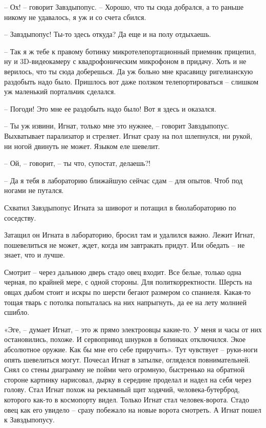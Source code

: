 \documentclass[ebook,oneside,final,openright]{memoir}
\begin{document}
– Ох! – говорит Завздыпопус. – Хорошо, что ты сюда добрался, а то раньше никому не удавалось, я уж и со счета сбился.\par
– Завздыпопус! Ты-то здесь откуда? Да еще и на полу отдыхаешь.\par
– Так я ж тебе к правому ботинку микротелепортационный приемник прицепил, ну и 3D-видеокамеру с квадрофоническим микрофоном в придачу. Хоть и не верилось, что ты сюда доберешься. Да уж больно мне красавицу ригелианскую раздобыть надо было. Пришлось вот даже ползком телепортироваться – слишком уж маленький портальчик сделался.\par
– Погоди! Это мне ее раздобыть надо было! Вот я здесь и оказался.\par
– Ты уж извини, Игнат, только мне это нужнее, – говорит Завздыпопус. Выхватывает парализатор и стреляет. Игнат сразу на пол шлепнулся, ни рукой, ни ногой двинуть не может. Языком еле шевелит.\par
– Ой, – говорит, – ты что, супостат, делаешь?!\par
– Да я тебя в лабораторию ближайшую сейчас сдам – для опытов. Чтоб под ногами не путался.\par
Схватил Завздыпопус Игната за шиворот и потащил в биолабораторию по соседству.\par
\par
Затащил он Игната в лабораторию, бросил там и удалился важно. Лежит Игнат, пошевелиться не может, ждет, когда им завтракать придут. Или обедать – не знает, что и лучше. \par
Смотрит – через дальнюю дверь стадо овец входит. Все белые, только одна черная, по крайней мере, с одной стороны. Для политкорректности. Шерсть на овцах дыбом стоит и искры по шерсти бегают размером со спаниеля. Какая-то тощая тварь с потолка попыталась на них напрыгнуть, да ее на лету молнией сшибло.\par
\par
«Эге, – думает Игнат, – это ж прямо электроовцы какие-то. У меня и часы от них остановились, похоже. И сервопривод шнурков в ботинках отключился. Экое абсолютное оружие. Как бы мне его себе приручить». Тут чувствует – руки-ноги опять шевелиться могут. Почесал Игнат в затылке, огляделся повнимательней. Снял со стены диаграмму не пойми чего огромную, быстренько на обратной стороне картинку нарисовал, дырку в середине проделал и надел на себя через голову. Стал Игнат похож на рекламный щит ходячий, человека-бутерброд, которого как-то в космопорту видел. Только Игнат стал человек-ворота. Стадо овец как его увидело – сразу побежало на новые ворота смотреть. А Игнат пошел к Завздыпопусу.\par
\end{document}
